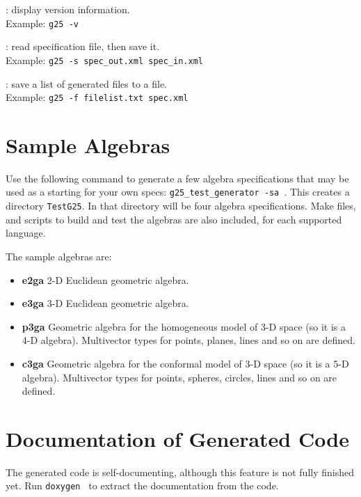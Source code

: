 \documentclass[10pt, a4paper]{article}
\begin{document}
\vspace*{2mm}

: display version information.\\
Example: {\tt g25 -v}

\vspace*{2mm}

: read specification file, then save it.\\
Example: {\tt g25 -s spec\_out.xml spec\_in.xml}

\vspace*{2mm}

: save a list of generated files to a file.\\
Example: {\tt g25 -f filelist.txt spec.xml}

\section{Sample Algebras}
\label{s:sample_algebras}

Use the following command to generate a few algebra specifications that may be used
as a starting for your own specs: {\tt g25\_test\_generator -sa }.
This creates a directory {\tt TestG25}. In that directory will be four algebra specifications.
Make files, and scripts to build and test the algebras are also included, for each supported
language.

The sample algebras are:
\begin{itemize}
\item {\bf e2ga} 2-D Euclidean geometric algebra.
\item {\bf e3ga} 3-D Euclidean geometric algebra.
\item {\bf p3ga} Geometric algebra for the homogeneous model of 3-D space (so it is a 4-D algebra).
Multivector types for points, planes, lines and so on are defined.
\item {\bf c3ga} Geometric algebra for the conformal model of 3-D space (so it is a 5-D algebra).
Multivector types for points, spheres, circles, lines and so on are defined.
\end{itemize}

\section{Documentation of Generated Code}

The generated code is self-documenting, although this
feature is not fully finished yet. Run {\tt doxygen } to extract
the documentation from the code.
\end{document}
